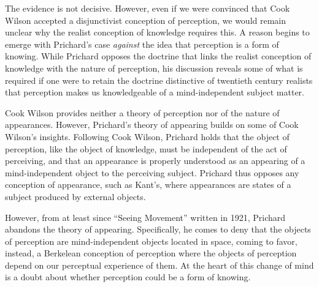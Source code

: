The evidence is not decisive. However, even if we were convinced that Cook Wilson accepted a disjunctivist conception of perception, we would remain unclear why the realist conception of knowledge requires this. A reason begins to emerge with Prichard's case \emph{against} the idea that perception is a form of knowing. While Prichard opposes the doctrine that links the realist conception of knowledge with the nature of perception, his discussion reveals some of what is required if one were to retain the doctrine distinctive of twentieth century realists that perception makes us knowledgeable of a mind-independent subject matter.

Cook Wilson provides neither a theory of perception nor of the nature of appearances. However, Prichard's \citeyear[]{Prichard:1906gf,Prichard:1909yg} theory of appearing builds on some of Cook Wilson's insights. Following Cook Wilson, Prichard holds that the object of perception, like the object of knowledge, must be independent of the act of perceiving, and that an appearance is properly understood as an appearing of a mind-independent object to the perceiving subject. Prichard thus opposes any conception of appearance, such as Kant's, where appearances are states of a subject produced by external objects. 

However, from at least since ``Seeing Movement'' written in 1921, Prichard abandons the theory of appearing. Specifically, he comes to deny that the objects of perception are mind-independent objects located in space, coming to favor, instead, a Berkelean conception of perception where the objects of perception depend on our perceptual experience of them. At the heart of this change of mind is a doubt about whether perception could be a form of knowing.

